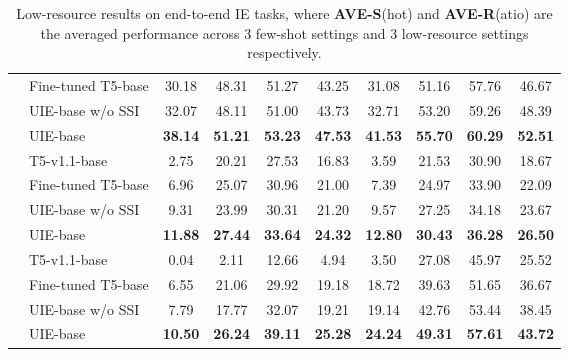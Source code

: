 \documentclass[11pt]{article}
\begin{document}
\begin{table*}[htbp]
{\begin{tabular}{cl|cccc|cccc}
      & Fine-tuned T5-base & 30.18  & 48.31  & 51.27  & 43.25  & 31.08  & 51.16  & 57.76  & 46.67  \\
      & UIE-base w/o SSI & 32.07  & 48.11  & 51.00  & 43.73  & 32.71  & 53.20  & 59.26  & 48.39  \\
      & UIE-base & \textbf{38.14} & \textbf{51.21} & \textbf{53.23} & \textbf{47.53} & \textbf{41.53} & \textbf{55.70} & \textbf{60.29} & \textbf{52.51} \\
\midrule
{} & T5-v1.1-base & 2.75  & 20.21  & 27.53  & 16.83  & 3.59  & 21.53  & 30.90  & 18.67  \\
      & Fine-tuned T5-base & 6.96  & 25.07  & 30.96  & 21.00  & 7.39  & 24.97  & 33.90  & 22.09  \\
      & UIE-base w/o SSI & 9.31  & 23.99  & 30.31  & 21.20  & 9.57  & 27.25  & 34.18  & 23.67  \\
      & UIE-base & \textbf{11.88} & \textbf{27.44} & \textbf{33.64} & \textbf{24.32} & \textbf{12.80} & \textbf{30.43} & \textbf{36.28} & \textbf{26.50} \\
\midrule
{} & T5-v1.1-base & 0.04  & 2.11  & 12.66  & 4.94  & 3.50  & 27.08  & 45.97  & 25.52  \\
      & Fine-tuned T5-base & 6.55  & 21.06  & 29.92  & 19.18  & 18.72  & 39.63  & 51.65  & 36.67  \\
      & UIE-base w/o SSI & 7.79  & 17.77  & 32.07  & 19.21  & 19.14  & 42.76  & 53.44  & 38.45  \\
      & UIE-base & \textbf{10.50} & \textbf{26.24} & \textbf{39.11} & \textbf{25.28} & \textbf{24.24} & \textbf{49.31} & \textbf{57.61} & \textbf{43.72} \\
\bottomrule
\end{tabular}

}


\caption{
    Low-resource results on end-to-end IE tasks, where \textbf{AVE-S}(hot) and \textbf{AVE-R}(atio) are the averaged performance across 3 few-shot settings and 3 low-resource settings respectively.
}
\label{tab:lowresource}

\end{table*} 
\end{document}
